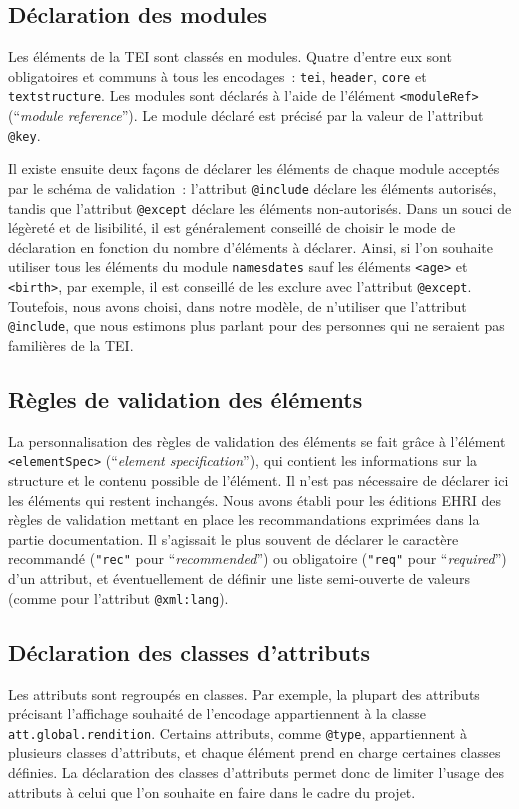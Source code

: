 \subsection{Déclaration des modules}
Les éléments de la TEI sont classés en modules. Quatre d'entre eux sont obligatoires et communs à tous les encodages~: \texttt{tei}, \texttt{header}, \texttt{core} et \texttt{textstructure}. Les modules sont déclarés à l'aide de l'élément \texttt{<moduleRef>} (\enquote{\textit{module reference}}). Le module déclaré est précisé par la valeur de l'attribut \texttt{@key}.  

Il existe ensuite deux façons de déclarer les éléments de chaque module acceptés par le schéma de validation~: l'attribut \texttt{@include} déclare les éléments autorisés, tandis que l'attribut \texttt{@except} déclare les éléments non-autorisés. Dans un souci de légèreté et de lisibilité, il est généralement conseillé de choisir le mode de déclaration en fonction du nombre d'éléments à déclarer. Ainsi, si l'on souhaite utiliser tous les éléments du module \texttt{namesdates} sauf les éléments \texttt{<age>} et \texttt{<birth>}, par exemple, il est conseillé de les exclure avec l'attribut \texttt{@except}. Toutefois, nous avons choisi, dans notre modèle, de n'utiliser que l'attribut \texttt{@include}, que nous estimons plus parlant pour des personnes qui ne seraient pas familières de la TEI.


\subsection{Règles de validation des éléments}
La personnalisation des règles de validation des éléments se fait grâce à l'élément \texttt{<elementSpec>} (\enquote{\textit{element specification}}), qui contient les informations sur la structure et le contenu possible de l'élément. Il n'est pas nécessaire de déclarer ici les éléments qui restent inchangés. Nous avons établi pour les éditions EHRI des règles de validation mettant en place les recommandations exprimées dans la partie documentation. Il s'agissait le plus souvent de déclarer le caractère recommandé (\texttt{"rec"} pour \enquote{\textit{recommended}}) ou obligatoire (\texttt{"req"} pour \enquote{\textit{required}}) d'un attribut, et éventuellement de définir une liste semi-ouverte de valeurs (comme pour l'attribut \texttt{@xml:lang}).


\subsection{Déclaration des classes d'attributs}
Les attributs sont regroupés en classes. Par exemple, la plupart des attributs précisant l'affichage souhaité de l'encodage appartiennent à la classe \texttt{att.global.rendition}. Certains attributs, comme \texttt{@type}, appartiennent à plusieurs classes d'attributs, et chaque élément prend en charge certaines classes définies. La déclaration des classes d'attributs permet donc de limiter l'usage des attributs à celui que l'on souhaite en faire dans le cadre du projet.